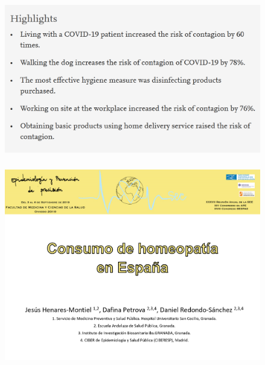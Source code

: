 \documentclass{beamer}
\begin{document}

\begin{frame}\frametitle{}
	\begin{figure}
		\centering
		\includegraphics[width=.9\textwidth]{images/covid2.png}
	\end{figure}
\end{frame}


\begin{frame}\frametitle{}
	\begin{figure}
		\centering
		\includegraphics[width=.85\textwidth]{images/homeopatia1.png}
	\end{figure}
\end{frame}

\end{document}
